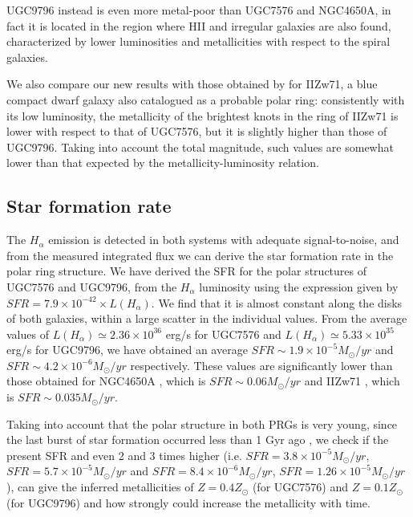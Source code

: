 \documentclass{aa}
\begin{document}
UGC9796 instead is even more metal-poor than UGC7576 and NGC4650A, in
fact it is located in the region where HII and irregular galaxies are
also found, characterized by lower luminosities and metallicities with
respect to the spiral galaxies.

We also compare our new results with those obtained by \cite{Per09} for
IIZw71, a blue compact dwarf galaxy also catalogued as a probable
polar ring: consistently with its
low luminosity, the metallicity of the brightest knots in the ring of
IIZw71 is lower with respect to that of UGC7576, but it is slightly
higher than those of UGC9796. Taking into account the total magnitude,
such values are somewhat lower than that expected by the
metallicity-luminosity relation.

\subsection{Star formation rate}

The $H_{\alpha}$ emission is detected in both systems with adequate
signal-to-noise, and from the measured integrated flux we can derive
the star formation rate in the polar ring structure. We have derived
the SFR for the polar structures of UGC7576 and UGC9796, from the
$H_{\alpha}$ luminosity using the expression given by \cite{Ken98}
$SFR = 7.9 \times 10^{-42} \times L(H_{\alpha})$. We find that it is
almost constant along the disks of both galaxies, within a large
scatter in the individual values. From the average values of
$L(H_{\alpha}) \simeq 2.36 \times 10^{36}$ erg/s for UGC7576 and
$L(H_{\alpha}) \simeq 5.33 \times 10^{35}$ erg/s for UGC9796, we have
obtained an average $SFR \sim 1.9 \times 10^{-5} M_{\odot}/yr$ and
$SFR \sim 4.2 \times 10^{-6} M_{\odot}/yr$ respectively. These values
are significantly lower than those obtained for NGC4650A
\citep{Spav10}, which is $SFR \sim 0.06 M_{\odot}/yr$ and IIZw71
\citep{Per09}, which is $SFR \sim 0.035 M_{\odot}/yr$.

Taking into account that the polar structure in both PRGs is
very young, since the last burst of star formation occurred less than
1 Gyr ago \citep{Res94}, we check if the present SFR and even 2 and 3
times higher (i.e. $SFR = 3.8 \times 10^{-5} M_{\odot}/yr$, $SFR = 5.7
\times 10^{-5} M_{\odot}/yr$ and $SFR = 8.4 \times 10^{-6}
M_{\odot}/yr$, $SFR = 1.26 \times 10^{-5} M_{\odot}/yr$), can give the
inferred metallicities of $Z=0.4 Z_{\odot}$ (for UGC7576) and $Z=0.1
Z_{\odot}$ (for UGC9796) and how strongly could increase the
metallicity with time.
\end{document}
